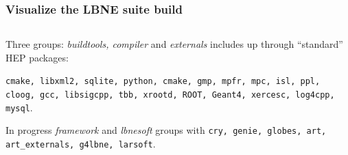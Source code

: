\documentclass[xcolor=dvipsnames]{beamer}
\begin{document}
\begin{frame}[fragile]
  \frametitle{Visualize the LBNE suite build}
  \begin{columns}
    \begin{column}{0.7\paperwidth}

      Three groups: \textit{buildtools, compiler} and \textit{externals} includes up through ``standard'' HEP packages:
      \vspace{5mm}

      \texttt{cmake, libxml2, sqlite, python, cmake, gmp, mpfr, mpc, isl, ppl, cloog, gcc, libsigcpp, tbb, xrootd, ROOT, Geant4, xercesc, log4cpp, mysql}.

      \vspace{5mm}
      In progress \textit{framework} and \textit{lbnesoft} groups with \texttt{cry, genie, globes, art, art\_externals, g4lbne, larsoft}.


\end{column}
\end{columns}
\end{frame}
\end{document}
